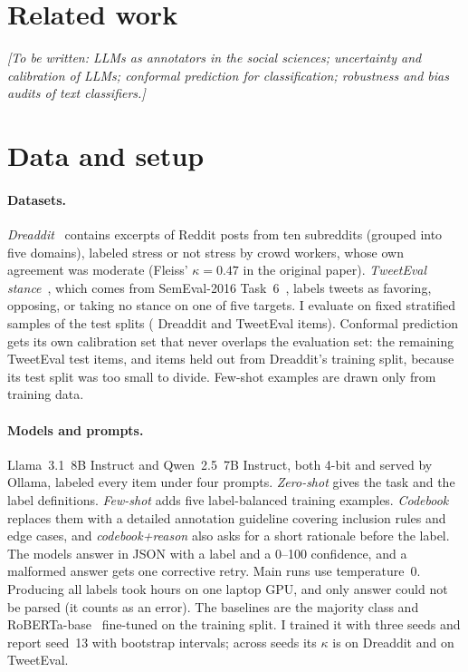 \documentclass[10pt,twocolumn]{article}
\begin{document}
\section{Related work}
\emph{[To be written: LLMs as annotators in the social sciences; uncertainty and calibration of
LLMs; conformal prediction for classification; robustness and bias audits of text
classifiers.]}

\section{Data and setup}
\paragraph{Datasets.} \emph{Dreaddit}~\cite{turcan2019dreaddit} contains excerpts of Reddit
posts from ten subreddits (grouped into five domains), labeled stress or not stress by crowd
workers, whose own agreement was moderate (Fleiss' $\kappa=0.47$ in the original paper).
\emph{TweetEval stance}~\cite{barbieri2020tweeteval}, which comes from SemEval-2016
Task~6~\cite{mohammad2016semeval}, labels tweets as favoring, opposing, or taking no stance on one
of five targets. I evaluate on fixed stratified samples of the test splits (\nEvalDr{} Dreaddit
and \nEvalTe{} TweetEval items). Conformal prediction gets its own calibration set that never
overlaps the evaluation set: the remaining \nCalTe{} TweetEval test items, and \nCalDr{} items
held out from Dreaddit's training split, because its test split was too small to divide.
Few-shot examples are drawn only from training data.

\paragraph{Models and prompts.} Llama~3.1~8B Instruct and Qwen~2.5~7B Instruct, both 4-bit and
served by Ollama, labeled every item under four prompts. \emph{Zero-shot} gives the task and the
label definitions. \emph{Few-shot} adds five label-balanced training examples. \emph{Codebook}
replaces them with a detailed annotation guideline covering inclusion rules and edge cases, and
\emph{codebook+reason} also asks for a short rationale before the label. The models answer in
JSON with a label and a 0--100 confidence, and a malformed answer gets one corrective retry. Main
runs use temperature~0. Producing all \nCalls{} labels took \runHours{} hours on one laptop GPU,
and only \nParseFail{} answer could not be parsed (it counts as an error). The baselines are the
majority class and RoBERTa-base~\cite{liu2019roberta} fine-tuned on the training split. I trained
it with three seeds and report seed~13 with bootstrap intervals; across seeds its $\kappa$ is
\kappaFtSeedsDr{} on Dreaddit and \kappaFtSeedsTe{} on TweetEval.
\end{document}
